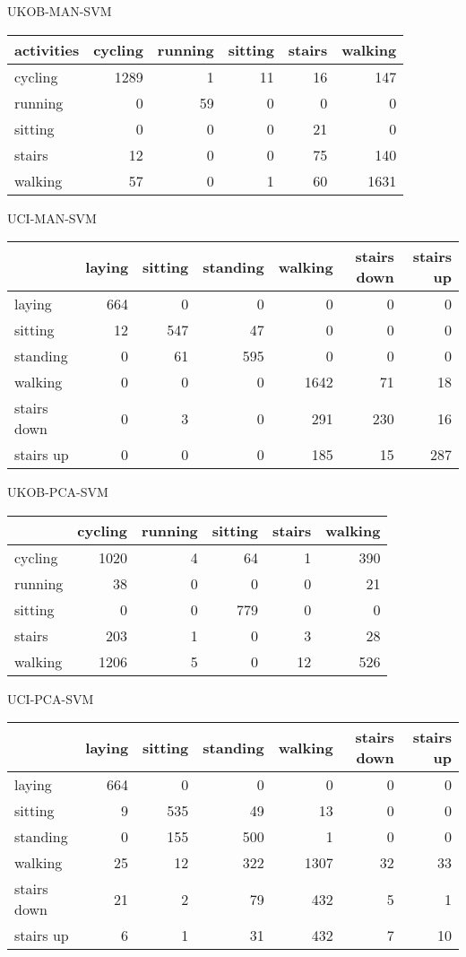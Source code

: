 UKOB-MAN-SVM

\begin{tabular}{|l|rrrrr|} \hline
activities & cycling & running & sitting & stairs & walking\\
\hline
cycling & 1289 & 1 & 11 & 16 & 147\\
running & 0 & 59 & 0 & 0 & 0\\
sitting & 0 & 0 & 0 & 21 & 0\\
stairs & 12 & 0 & 0 & 75 & 140\\
walking & 57 & 0 & 1 & 60 & 1631\\
\hline
\end{tabular}

UCI-MAN-SVM

\begin{tabular}{|l|rrrrrr|} \hline
 & laying & sitting & standing & walking & stairs down & stairs up\\
\hline
laying & 664 & 0 & 0 & 0 & 0 & 0\\
sitting & 12 & 547 & 47 & 0 & 0 & 0\\
standing & 0 & 61 & 595 & 0 & 0 & 0\\
walking & 0 & 0 & 0 & 1642 & 71 & 18\\
stairs down & 0 & 3 & 0 & 291 & 230 & 16\\
stairs up & 0 & 0 & 0 & 185 & 15 & 287\\
\hline
\end{tabular}

UKOB-PCA-SVM

\begin{tabular}{|l|rrrrr|} \hline
 & cycling & running & sitting & stairs & walking\\
\hline
cycling & 1020 & 4 & 64 & 1 & 390\\
running & 38 & 0 & 0 & 0 & 21\\
sitting & 0 & 0 & 779 & 0 & 0\\
stairs & 203 & 1 & 0 & 3 & 28\\
walking & 1206 & 5 & 0 & 12 & 526\\
\hline
\end{tabular}

UCI-PCA-SVM

\begin{tabular}{|l|rrrrrr|} \hline
 & laying & sitting & standing & walking & stairs down & stairs up\\
\hline
laying & 664 & 0 & 0 & 0 & 0 & 0\\
sitting & 9 & 535 & 49 & 13 & 0 & 0\\
standing & 0 & 155 & 500 & 1 & 0 & 0\\
walking & 25 & 12 & 322 & 1307 & 32 & 33\\
stairs down & 21 & 2 & 79 & 432 & 5 & 1\\
stairs up & 6 & 1 & 31 & 432 & 7 & 10\\
\hline
\end{tabular}


